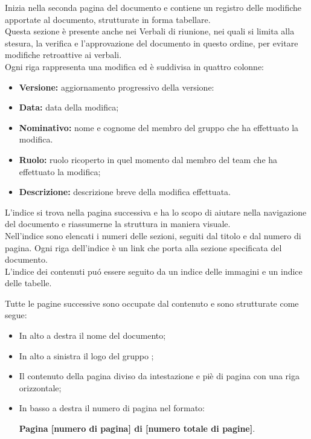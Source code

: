        Inizia nella seconda pagina del documento e contiene un registro delle modifiche apportate al documento, strutturate in forma tabellare.\\
        Questa sezione è presente anche nei Verbali di riunione, nei quali si limita alla stesura, la verifica e l'approvazione del documento in questo ordine, per evitare modifiche retroattive ai verbali.\\
        Ogni riga rappresenta una modifica ed è suddivisa in quattro colonne:
        \begin{itemize}
          \item \textbf{Versione:} aggiornamento progressivo della versione:
          \item \textbf{Data:} data della modifica;
          \item \textbf{Nominativo:} nome e cognome del membro del gruppo che ha effettuato la modifica.
          \item \textbf{Ruolo:} ruolo ricoperto in quel momento dal membro del team che ha effettuato la modifica;
          \item \textbf{Descrizione:} descrizione breve della modifica effettuata.
        \end{itemize}

        L'indice si trova nella pagina successiva e ha lo scopo di aiutare nella navigazione del documento e riassumerne la struttura in maniera visuale.\\
        Nell'indice sono elencati i numeri delle sezioni, seguiti dal titolo e dal numero di pagina. Ogni riga dell'indice è un link che porta alla sezione specificata del documento.\\
        L'indice dei contenuti puó essere seguito da un indice delle immagini e un indice delle tabelle.

        Tutte le pagine successive sono occupate dal contenuto e sono strutturate come segue:
        \begin{itemize}
          \item In alto a destra il nome del documento;
          \item In alto a sinistra il logo del gruppo \Gruppo{};
          \item Il contenuto della pagina diviso da intestazione e piè di pagina con una riga orizzontale;
          \item In basso a destra il numero di pagina nel formato:
          \begin{center}
            \textbf{Pagina [numero di pagina] di [numero totale di pagine]}.
          \end{center}
        \end{itemize}

